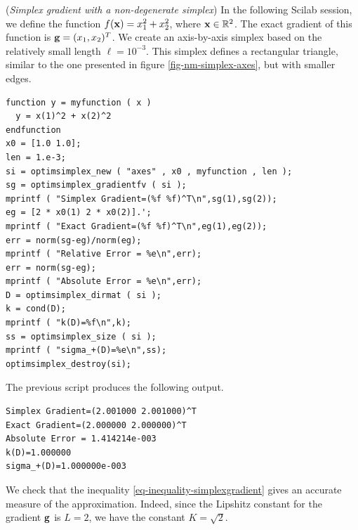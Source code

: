 \begin{example}
(\emph{Simplex gradient with a non-degenerate simplex})
In the following Scilab session, we define the 
function $f(\mathbf{x})=x_1^2 + x_2^2$, where $\mathbf{x}\in\mathbb{R}^2$.
The exact gradient of this function is $\mathbf{g}=(x_1,x_2)^T$.
We create an axis-by-axis simplex based on the relatively
small length $\ell=10^{-3}$. This simplex defines 
a rectangular triangle, similar to the one presented in
figure \ref{fig-nm-simplex-axes}, but with smaller 
edges.

\lstset{language=scilabscript}
\begin{lstlisting}
function y = myfunction ( x )
  y = x(1)^2 + x(2)^2
endfunction
x0 = [1.0 1.0];
len = 1.e-3;
si = optimsimplex_new ( "axes" , x0 , myfunction , len );
sg = optimsimplex_gradientfv ( si );
mprintf ( "Simplex Gradient=(%f %f)^T\n",sg(1),sg(2));
eg = [2 * x0(1) 2 * x0(2)].';
mprintf ( "Exact Gradient=(%f %f)^T\n",eg(1),eg(2));
err = norm(sg-eg)/norm(eg);
mprintf ( "Relative Error = %e\n",err);
err = norm(sg-eg);
mprintf ( "Absolute Error = %e\n",err);
D = optimsimplex_dirmat ( si );
k = cond(D);
mprintf ( "k(D)=%f\n",k);
ss = optimsimplex_size ( si );
mprintf ( "sigma_+(D)=%e\n",ss);
optimsimplex_destroy(si);
\end{lstlisting}

The previous script produces the following output.
\lstset{language=scilabscript}
\begin{lstlisting}
Simplex Gradient=(2.001000 2.001000)^T
Exact Gradient=(2.000000 2.000000)^T
Absolute Error = 1.414214e-003
k(D)=1.000000
sigma_+(D)=1.000000e-003
\end{lstlisting}
We check that the inequality \ref{eq-inequality-simplexgradient}
gives an accurate measure of the approximation. Indeed, since the 
Lipshitz constant for the gradient $\mathbf{g}$ is $L=2$,
we have the constant $K=\sqrt{2}$.
\end{example}

